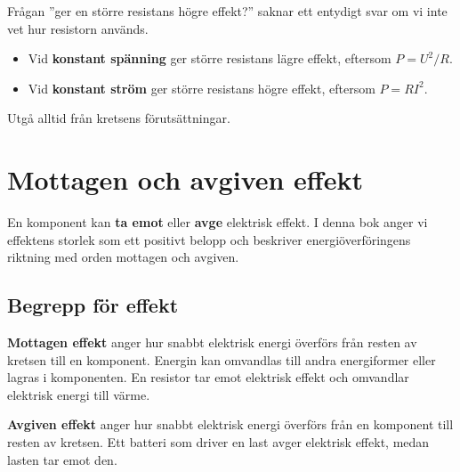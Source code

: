 \documentclass[
  swedish,
  11pt,
  a4paper,
  DIV=11,
  numbers=noendperiod,
  twoside,
  open=any]{scrreprt}
\providecommand{\tightlist}{%
  \setlength{\itemsep}{0pt}\setlength{\parskip}{0pt}}
\begin{document}
\begin{tcolorbox}[enhanced jigsaw, arc=.35mm, bottomrule=.15mm, bottomtitle=1mm, breakable, colback=white, colbacktitle=quarto-callout-tip-color!10!white, colframe=quarto-callout-tip-color-frame, coltitle=black, left=2mm, leftrule=.75mm, opacityback=0, opacitybacktitle=0.6, rightrule=.15mm, title=\textcolor{quarto-callout-tip-color}{\faLightbulb}\hspace{0.5em}{Ange vad som hålls konstant}, titlerule=0mm, toprule=.15mm, toptitle=1mm]

Frågan ''ger en större resistans högre effekt?'' saknar ett entydigt
svar om vi inte vet hur resistorn används.

\begin{itemize}
\tightlist
\item
  Vid \textbf{konstant spänning} ger större resistans lägre effekt,
  eftersom \(P = U^2/R\).
\item
  Vid \textbf{konstant ström} ger större resistans högre effekt,
  eftersom \(P = RI^2\).
\end{itemize}

Utgå alltid från kretsens förutsättningar.

\end{tcolorbox}

\section{Mottagen och avgiven
effekt}\label{sec-effekt-mottagen-och-avgiven-effekt}

En komponent kan \textbf{ta emot} eller \textbf{avge} elektrisk effekt.
I denna bok anger vi effektens storlek som ett positivt belopp och
beskriver energiöverföringens riktning med orden mottagen och avgiven.

\subsection{Begrepp för effekt}\label{sec-effekt-begrepp-for-effekt}

\textbf{Mottagen effekt} anger hur snabbt elektrisk energi överförs från
resten av kretsen till en komponent. Energin kan omvandlas till andra
energiformer eller lagras i komponenten. En resistor tar emot elektrisk
effekt och omvandlar elektrisk energi till värme.

\textbf{Avgiven effekt} anger hur snabbt elektrisk energi överförs från
en komponent till resten av kretsen. Ett batteri som driver en last
avger elektrisk effekt, medan lasten tar emot den.
\end{document}
